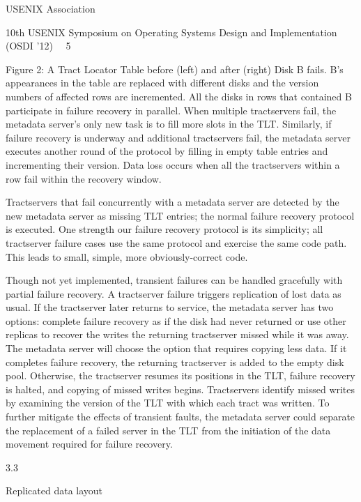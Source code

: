 USENIX Association  

10th USENIX Symposium on Operating Systems Design and Implementation (OSDI ’12)  5


Figure 2: A Tract Locator Table before (left) and after (right) Disk B fails. B’s appearances in the table are replaced
with different disks and the version numbers of affected rows are incremented. All the disks in rows that contained B
participate in failure recovery in parallel.
When multiple tractservers fail, the metadata server’s
only new task is to fill more slots in the TLT. Similarly, if
failure recovery is underway and additional tractservers
fail, the metadata server executes another round of the
protocol by filling in empty table entries and incrementing their version. Data loss occurs when all the tractservers within a row fail within the recovery window.

Tractservers that fail concurrently with a metadata
server are detected by the new metadata server as missing TLT entries; the normal failure recovery protocol is
executed. One strength our failure recovery protocol is
its simplicity; all tractserver failure cases use the same
protocol and exercise the same code path. This leads to
small, simple, more obviously-correct code.

Though not yet implemented, transient failures can be
handled gracefully with partial failure recovery. A tractserver failure triggers replication of lost data as usual.
If the tractserver later returns to service, the metadata
server has two options: complete failure recovery as if
the disk had never returned or use other replicas to recover the writes the returning tractserver missed while it
was away. The metadata server will choose the option
that requires copying less data. If it completes failure
recovery, the returning tractserver is added to the empty
disk pool. Otherwise, the tractserver resumes its positions in the TLT, failure recovery is halted, and copying of missed writes begins. Tractservers identify missed
writes by examining the version of the TLT with which
each tract was written. To further mitigate the effects of
transient faults, the metadata server could separate the
replacement of a failed server in the TLT from the initiation of the data movement required for failure recovery.

3.3

Replicated data layout

